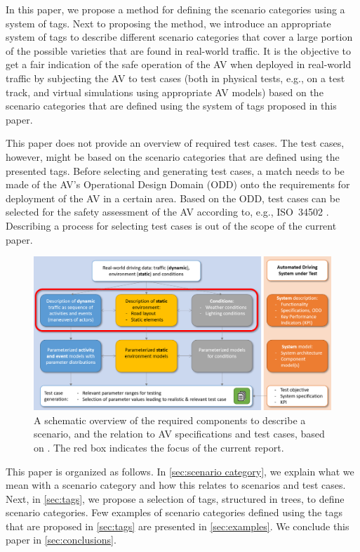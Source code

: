 \documentclass[twoside,twocolumn,9pt]{extarticle}
\theoremstyle{plain}
\begin{document}
In this paper, we propose a method for defining the scenario categories using a system of tags. Next to proposing the method, we introduce an appropriate system of tags to describe different scenario categories that cover a large portion of the possible varieties that are found in real-world traffic.
It is the objective to get a fair indication of the safe operation of the AV when deployed in real-world traffic by subjecting the AV to test cases (both in physical tests, e.g., on a test track, and virtual simulations using appropriate AV models) based on the scenario categories that are defined using the system of tags proposed in this paper.

This paper does not provide an overview of required test cases. The test cases, however, might be based on the scenario categories that are defined using the presented tags. Before selecting and generating test cases, a match needs to be made of the AV's Operational Design Domain (ODD) \autocite{sae2018j3016} onto the requirements for deployment of the AV in a certain area. %
Based on the ODD, test cases can be selected for the safety assessment of the AV according to, e.g., ISO~34502 \autocite{ISO34502}. Describing a process for selecting test cases is out of the scope of the current paper. 

\begin{figure}[t]
	\centering
	\includegraphics[width=\linewidth]{scenario_schematic}	
	\caption{A schematic overview of the required components to describe a scenario, and the relation to AV specifications and test cases, based on \cite{elrofai2018scenario}. The red box indicates the focus of the current report.}
	\label{fig:scenario schematic}
\end{figure}

This paper is organized as follows. In \cref{sec:scenario category}, we explain what we mean with a scenario category and how this relates to scenarios and test cases. Next, in \cref{sec:tags}, we propose a selection of tags, structured in trees, to define scenario categories. Few examples of scenario categories defined using the tags that are proposed in \cref{sec:tags} are presented in \cref{sec:examples}. We conclude this paper in \cref{sec:conclusions}.
\end{document}
